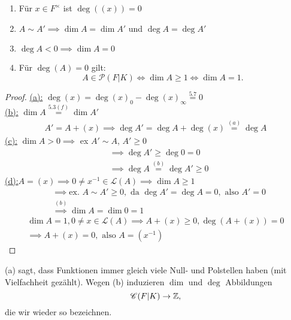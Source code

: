 \begin{korollar}
    \begin{enumerate}[label=(\alph*)]
        \item Für $x \in F^\times$ ist $\deg ((x)) = 0$
        \item $A \sim A' \implies \dim A = \dim A'$ und $\deg A = \deg A'$
        \item $\deg A < 0 \implies \dim A = 0$
        \item Für $\deg (A) = 0$ gilt:
        $$ A \in \mathscr{P}(F|K) \iff \dim A \geq 1 \iff \dim A =1.$$
    \end{enumerate}
\end{korollar}
\begin{proof}
    \underline{(a):} $\deg (x) = \deg (x)_0 - \deg (x)_\infty \stackrel{5.7}{=} 0$\\
    \underline{(b):} $\dim A \stackrel{5.3(f)}{=} \dim A'$ 
    \begin{align*}
        A' = A + (x) \implies \deg A' = \deg A + \deg (x) \stackrel{(a)}{=} \deg A
    \end{align*}
    \underline{(c):} $\dim A > 0 \implies$ ex $A' \sim A$, $A' \geq 0$
    \begin{align*}
        & \implies \deg A' \geq \deg 0 = 0\\
        & \implies \deg A \stackrel{(b)}{=} \deg A' \geq 0
    \end{align*}
    \underline{(d):}$A=(x) \implies 0 \ne x^{-1} \in \mathcal{L}(A) \implies \dim A \geq 1$
    \begin{align*}
        & \implies \text{ex. }A \sim A' \geq 0, \text{ da } \deg A' = \deg A =0, \text{ also } A'=0\\
        &\stackrel{(b)}{\implies} \dim A = \dim 0 = 1
    \end{align*}
    \begin{align*}
        \dim A = 1, 0 \ne x \in \mathcal{L}(A) \implies A + (x) \geq 0, \deg (A+ (x)) = 0 \\
        \implies A + (x) = 0, \text{ also } A = (x^{-1})
    \end{align*}
\end{proof}

\begin{bemerkungnr}
    (a) sagt, dass Funktionen immer gleich viele Null- und Polstellen haben (mit Vielfachheit gezählt).
    Wegen (b) induzieren $\dim$ und $\deg$ Abbildungen
    $$ \mathscr{C}(F|K) \to \mathbb{Z},$$
    die wir wieder so bezeichnen.
\end{bemerkungnr}


